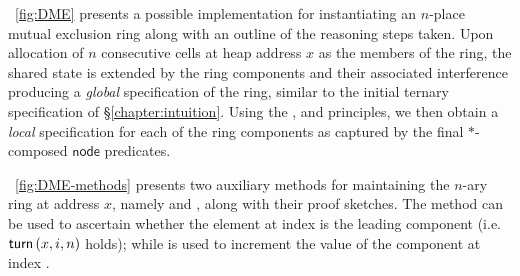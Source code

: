\fig~\ref{fig:DME} presents a possible implementation for instantiating an $n$-place mutual exclusion ring along with an outline of the reasoning steps taken. Upon allocation of $n$ consecutive cells at heap address $x$ as the members of the ring, the shared state is extended by the ring components and their associated interference producing a \emph{global} specification of the ring, similar to the initial ternary specification of \S\ref{chapter:intuition}. Using the \copyRule, \shiftRule and \forgetRule principles, we then obtain a \emph{local} specification for each of the ring components as captured by the final $*$-composed $\textsf{node}$ predicates. 

\fig~\ref{fig:DME-methods} presents two auxiliary methods for maintaining the $n$-ary ring at address $x$, namely  and , along with their \colosl proof sketches. The  method can be used to ascertain whether the element at index  is the leading component (i.e. $\textsf{turn}\left(x,i,n\right)$ holds); while  is used to increment the value of the component at index . 
%
%
